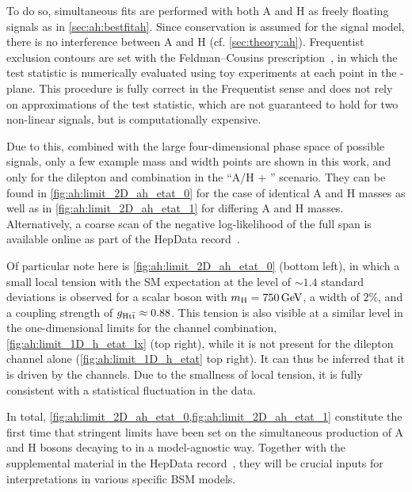 To do so, simultaneous fits are performed with both A and H as freely floating signals as in \cref{sec:ah:bestfitah}. Since \CP conservation is assumed for the signal model, there is no interference between A and H (cf. \cref{sec:theory:ah}). Frequentist exclusion contours are set with the Feldman--Cousins prescription~\cite{Feldman:1997qc,Cousins:1991qz}, in which the test statistic is numerically evaluated using toy experiments at each point in the \gAtt-\gHtt plane. This procedure is fully correct in the Frequentist sense and does not rely on approximations of the test statistic, which are not guaranteed to hold for two non-linear signals, but is computationally expensive.

Due to this, combined with the large four-dimensional phase space of possible signals, only a few example mass and width points are shown in this work, and only for the dilepton and \ljets combination in the ``A/H + \etat'' scenario. They can be found in \cref{fig:ah:limit_2D_ah_etat_0} for the case of identical A and H masses as well as in \cref{fig:ah:limit_2D_ah_etat_1} for differing A and H masses. 
Alternatively, a coarse scan of the negative log-likelihood of the full span is available online as part of the HepData record~\cite{CMS:HIG-22-013-hepdata}.

Of particular note here is \cref{fig:ah:limit_2D_ah_etat_0} (bottom left), in which a small local tension with the SM expectation at the level of $\sim1.4$ standard deviations is observed for a scalar boson with $\mH = \SI{750}{\GeV}$, a width of $2\%$, and a coupling strength of $g_{\mathrm{H t \bar{t}}} \approx 0.88$. This tension is also visible at a similar level in the one-dimensional limits for the channel combination, \cref{fig:ah:limit_1D_h_etat_lx} (top right), while it is not present for the dilepton channel alone (\cref{fig:ah:limit_1D_h_etat} top right). It can thus be inferred that it is driven by the \ljets channels. Due to the smallness of local tension, it is fully consistent with a statistical fluctuation in the data.

In total, \cref{fig:ah:limit_2D_ah_etat_0,fig:ah:limit_2D_ah_etat_1} constitute the first time that stringent limits have been set on the simultaneous production of A and H bosons decaying to \ttbar in a model-agnostic way. Together with the supplemental material in the HepData record~\cite{CMS:HIG-22-013-hepdata}, they will be crucial inputs for interpretations in various specific BSM models.

